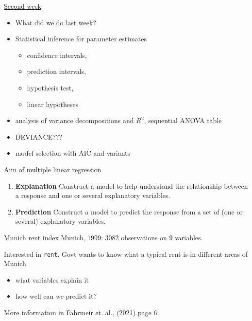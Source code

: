 \documentclass[
  ignorenonframetext,
]{beamer}
\providecommand{\tightlist}{%
  \setlength{\itemsep}{0pt}\setlength{\parskip}{0pt}}
\begin{document}
\begin{frame}
\begin{block}{\hyperlink{secondweek}{Second week}}
\protect{}\label{second-week}
\begin{itemize}
\tightlist
\item
  What did we do last week?
\item
  Statistical inference for parameter estimates

  \begin{itemize}
  \tightlist
  \item
    confidence intervals,
  \item
    prediction intervals,
  \item
    hypothesis test,
  \item
    linear hypotheses
  \end{itemize}
\item
  analysis of variance decompositions and \(R^2\), sequential ANOVA
  table
\item
  DEVIANCE???
\item
  model selection with AIC and variants
\end{itemize}
\end{block}
\end{frame}

\begin{frame}{Aim of multiple linear regression}
\protect{}\label{aim-of-multiple-linear-regression}
\begin{enumerate}
\item
  \textbf{Explanation} Construct a model to help understand the
  relationship between a response and one or several explanatory
  variables.
\item
  \textbf{Prediction} Construct a model to predict the response from a
  set of (one or several) explanatory variables.
\end{enumerate}
\end{frame}

\begin{frame}[fragile]
\begin{block}{Munich rent index}
\protect{}\label{munich-rent-index}
Munich, 1999: 3082 observations on 9 variables.

Interested in \texttt{rent}. Govt wants to know what a typical rent is
in different areas of Munich

\begin{itemize}
\tightlist
\item
  what variables explain it
\item
  how well can we predict it?
\end{itemize}

More information in Fahrmeir et. al., (2021) page 6.
\end{block}
\end{frame}
\end{document}

